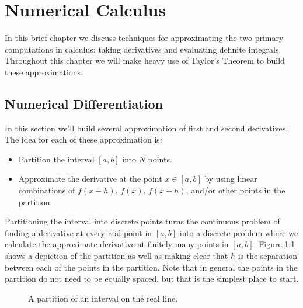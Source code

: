 \chapter{Numerical Calculus}
In this brief chapter we discuss techniques for approximating the two primary computations
in calculus: taking derivatives and evaluating definite integrals. Throughout this chapter
we will make heavy use of Taylor's Theorem to build these approximations. 


\section{Numerical Differentiation}
In this section we'll build several approximation of first and second derivatives.  The
idea for each of these approximation is:
\begin{itemize}
    \item Partition the interval $[a,b]$ into $N$ points.
    \item Approximate the derivative at the point $x \in [a,b]$ by using linear
        combinations of $f(x-h)$, $f(x)$, $f(x+h)$, and/or other points in the partition.  
\end{itemize}
Partitioning the interval into discrete points turns the continuous problem of finding a
derivative at every real point in $[a,b]$ into a discrete
problem where we calculate the approximate derivative at finitely many points in $[a,b]$.
Figure \ref{fig:differentiation_partition} shows a depiction of the partition as well as
making clear that $h$ is the separation between each of the points in the partition.  Note
that in general the points in the partition do not need to be equally spaced, but that is
the simplest place to start.
\begin{figure}[ht!]
    \begin{center}
    \end{center}
    \caption{A partition of an interval on the real line.}
    \label{fig:differentiation_partition}
\end{figure}

